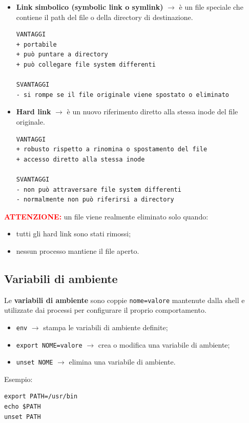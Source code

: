 \begin{itemize}
    \item \textbf{Link simbolico (symbolic link o symlink)} $\rightarrow$
    è un file speciale che contiene il path del file o della directory di destinazione.
    
    \begin{verbatim}
VANTAGGI
+ portabile
+ può puntare a directory
+ può collegare file system differenti

SVANTAGGI
- si rompe se il file originale viene spostato o eliminato
    \end{verbatim}

    \item \textbf{Hard link} $\rightarrow$
    è un nuovo riferimento diretto alla stessa inode del file originale.

    \begin{verbatim}
VANTAGGI
+ robusto rispetto a rinomina o spostamento del file
+ accesso diretto alla stessa inode

SVANTAGGI
- non può attraversare file system differenti
- normalmente non può riferirsi a directory
    \end{verbatim}
\end{itemize}

\noindent \textbf{\textcolor{red}{ATTENZIONE:}} un file viene realmente eliminato
solo quando:
\begin{itemize}
    \item tutti gli hard link sono stati rimossi;
    \item nessun processo mantiene il file aperto.
\end{itemize}

\vspace{0.3cm}

\subsection{Variabili di ambiente}
Le \textbf{variabili di ambiente} sono coppie \texttt{nome=valore}
mantenute dalla shell e utilizzate dai processi per configurare il proprio comportamento.

\begin{itemize}
    \item \texttt{env} $\rightarrow$ stampa le variabili di ambiente definite;
    
    \item \texttt{export NOME=valore} $\rightarrow$
    crea o modifica una variabile di ambiente;
    
    \item \texttt{unset NOME} $\rightarrow$
    elimina una variabile di ambiente.
\end{itemize}

\noindent Esempio:
\begin{verbatim}
export PATH=/usr/bin
echo $PATH
unset PATH
\end{verbatim}

